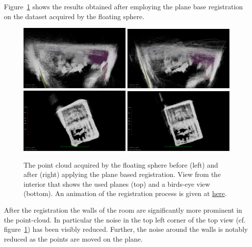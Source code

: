 Figure~\ref{fig:cylon-corrected} shows the results obtained after employing the plane base registration on the dataset acquired by the floating sphere.
\begin{figure}
	\centering
	\includegraphics[width=0.49\textwidth]{./images/cylon_uncorr_corner}\hfill
	\includegraphics[width=0.49\textwidth]{./images/cylon_corr_corner}\\
	\includegraphics[width=0.49\textwidth]{./images/cylon_uncorr_top}\hfill
	\includegraphics[width=0.49\textwidth]{./images/cylon_corr_top}
	\caption{The point cloud acquired by the floating sphere before (left) and after (right) applying the plane based registration. View from the interior that shows the used planes (top) and a birds-eye view (bottom). An animation of the registration process is given at \href{https://youtu.be/8XdIUN_9VpY}{here}.}
	\label{fig:cylon-corrected}
\end{figure}
After the registration the walls of the room are significantly more prominent in the point-cloud. 
In particular the noise in the top left corner of the top view (cf. figure~\ref{fig:cylon-corrected}) has been visibly reduced.
Further, the noise around the walls is notably reduced as the points are moved on the plane.

